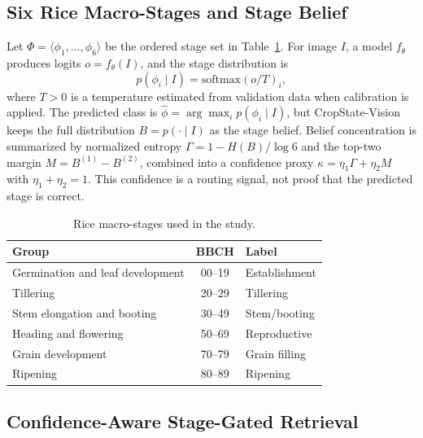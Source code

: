 \documentclass[conference]{IEEEtran}
\begin{document}


\subsection{Six Rice Macro-Stages and Stage Belief}

Let $\Phi = \langle \phi_1,\dots,\phi_6 \rangle$ be the ordered stage set in Table~\ref{tab:stages}. For image $I$, a model $f_\theta$ produces logits $o = f_\theta(I)$, and the stage distribution is
\begin{equation}
p(\phi_i \mid I) = \mathrm{softmax}(o/T)_i,
\label{eq:softmax}
\end{equation}
where $T > 0$ is a temperature estimated from validation data when calibration is applied. The predicted class is $\hat{\phi} = \arg\max_i p(\phi_i \mid I)$, but CropState-Vision keeps the full distribution $B=p(\cdot\mid I)$ as the stage belief. Belief concentration is summarized by normalized entropy $\Gamma = 1 - H(B)/\log 6$ and the top-two margin $M = B^{(1)} - B^{(2)}$, combined into a confidence proxy $\kappa = \eta_1\Gamma + \eta_2 M$ with $\eta_1+\eta_2=1$. This confidence is a routing signal, not proof that the predicted stage is correct.

\begin{table}[t]
\centering
\caption{Rice macro-stages used in the study.}
\label{tab:stages}
\begin{tabular}{lcl}
\toprule
\textbf{Group} & \textbf{BBCH} & \textbf{Label} \\
\midrule
Germination and leaf development & 00--19 & Establishment \\
Tillering & 20--29 & Tillering \\
Stem elongation and booting & 30--49 & Stem/booting \\
Heading and flowering & 50--69 & Reproductive \\
Grain development & 70--79 & Grain filling \\
Ripening & 80--89 & Ripening \\
\bottomrule
\end{tabular}
\end{table}

\subsection{Confidence-Aware Stage-Gated Retrieval}
\end{document}
